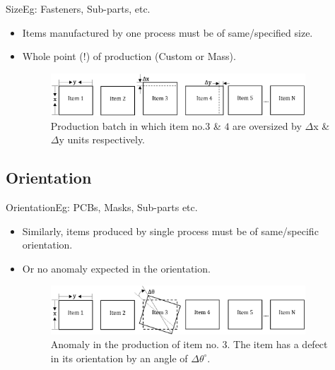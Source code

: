 \documentclass{beamer}
\begin{document}
\begin{frame}{Size}{Eg: Fasteners, Sub-parts, etc.}
  \begin{itemize}
  \item Items manufactured by one process must be of same/specified size.
  \item Whole point (!) of production (Custom or Mass).

  \begin{figure}
    \includegraphics[width=0.9\textwidth]{size}
    \caption{Production batch in which item no.$3$ \& $4$ are oversized by $\Delta$x \& $\Delta$y units respectively.}
    \label{fig:size_line}
  \end{figure}

  \end{itemize}
\end{frame}

\subsection{Orientation}

\begin{frame}{Orientation}{Eg: PCBs, Masks, Sub-parts etc.}
  \begin{itemize}
  \item Similarly, items produced by single process must be of same/specific orientation.
  \item Or no anomaly expected in the orientation.
  \begin{figure}
    \includegraphics[width=0.9\textwidth]{orientation}
    \caption{Anomaly in the production of item no. $3$. The item has a defect in its orientation by an angle of $\Delta\theta^\circ$.}
    \label{fig:orientation_line}
  \end{figure}
  \end{itemize}
\end{frame}
\end{document}
